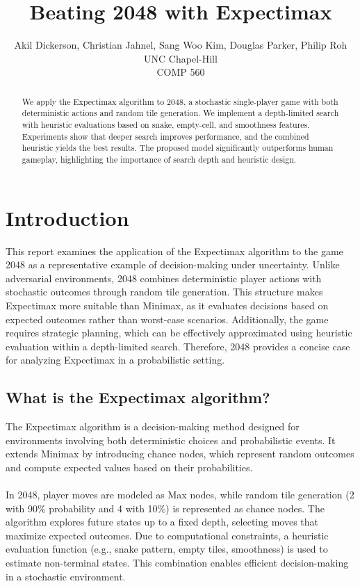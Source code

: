 \documentclass{article}
\title{Beating 2048 with Expectimax}
\author{
  Akil Dickerson, \space Christian Jahnel, \space Sang Woo Kim, \space Douglas Parker, \space Philip Roh\\
  UNC Chapel-Hill\\
  COMP 560
}
\begin{document}
\maketitle


\begin{abstract}
  We apply the Expectimax algorithm to 2048, a stochastic single-player game with both deterministic actions and
  random tile generation. We implement a depth-limited search with heuristic evaluations based on snake, empty-cell,
  and smoothness features. Experiments show that deeper search improves performance, and the combined heuristic
  yields the best results. The proposed model significantly outperforms human gameplay, highlighting the importance
  of search depth and heuristic design.
\end{abstract}

\section{Introduction}

This report examines the application of the Expectimax algorithm to the game 2048 as a representative example
of decision-making under uncertainty. Unlike adversarial environments, 2048 combines deterministic player actions
with stochastic outcomes through random tile generation. This structure makes Expectimax more suitable than Minimax,
as it evaluates decisions based on expected outcomes rather than worst-case scenarios. Additionally, the game
requires strategic planning, which can be effectively approximated using heuristic evaluation within a depth-limited
search. Therefore, 2048 provides a concise case for analyzing Expectimax in a probabilistic setting.

\subsection{What is the Expectimax algorithm?}

The Expectimax algorithm is a decision-making method designed for environments involving both deterministic choices
and probabilistic events. It extends Minimax by introducing chance nodes, which represent random outcomes and compute
expected values based on their probabilities.
\\
\\
In 2048, player moves are modeled as Max nodes, while random tile generation (2 with 90\% probability and 4 with 10\%) is represented as chance nodes. The algorithm explores future states up to a fixed depth, selecting moves that maximize expected outcomes. Due to computational constraints, a heuristic evaluation function (e.g., snake pattern, empty tiles, smoothness) is used to estimate non-terminal states. This combination enables efficient decision-making in a stochastic environment.
\end{document}
